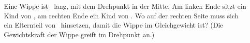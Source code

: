 Eine Wippe ist \LWO\ lang, mit dem Drehpunkt in der Mitte. Am linken Ende sitzt ein Kind von \maO, am rechten Ende ein Kind von \mbO. Wo auf der rechten Seite muss sich ein Elternteil von \mEO\ hinsetzen, damit die Wippe im Gleichgewicht ist? (Die Gewichtskraft der Wippe greift im Drehpunkt an.)
